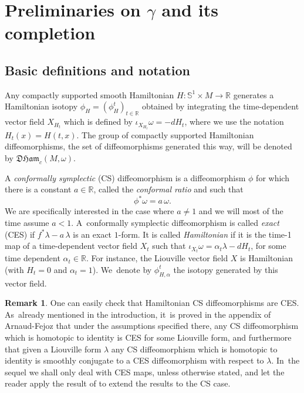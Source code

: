\documentclass[10pt]{amsart}
\theoremstyle{definition}
\newtheorem{rem}[thm]{Remark}
\newcommand{\R}{\mathbb{R}}
\newcommand{\DHam}{\mathfrak{DHam}}
\begin{document}
\section{Preliminaries on \texorpdfstring{$\gamma$}{gamma} and its completion}\label{sec:preliminaries}

\subsection{Basic definitions and notation}

Any compactly supported smooth Hamiltonian $H:\mathbb{S}^1\times M\to \R$ generates a Hamiltonian isotopy $\phi_H=(\phi_H^t)_{t\in\R}$ obtained by integrating the time-dependent vector field $X_{H_t}$ which is defined by $\iota_{X_{H_t}}\omega=-dH_t$, where we use the notation $H_t(x)=H(t,x)$. The group of compactly supported Hamiltonian diffeomorphisms, \ie the set of diffeomorphisms generated this way, will be denoted by $\DHam_c(M,\omega)$.

A \emph{conformally symplectic} (CS) diffeomorphism is a diffeomorphism $\phi$ for which there is a constant $a\in\R$, called the \emph{conformal ratio} and such that
\[
\phi^*\omega=a\,\omega.
\]
We are specifically interested in the case where $a\neq 1$ and we will most of the time assume $a<1$. A~conformally symplectic diffeomorphism is called \emph{exact} (CES) if $f^*\lambda-a\,\lambda$ is an exact $1$-form. It is called \emph{Hamiltonian} if it is the time-1 map of a time-dependent vector field $X_t$ such that $\iota_{X_t}\omega=\alpha_t\lambda-dH_t$, for some time dependent $\alpha_t\in\R$. For instance, the Liouville vector field $X$ is Hamiltonian (with $H_t=0$ and $\alpha_t=1$). We~denote by $\phi_{H, \alpha}^t$ the isotopy generated by this vector field.

\begin{rem}\label{rem:CSCES}
One can easily check that Hamiltonian CS diffeomorphisms are CES. As~already mentioned in the introduction, it~is proved in the appendix of Arnaud-Fejoz \cite{Arnaud-Fejoz} that under the assumptions specified there, any CS diffeomorphism which is homotopic to identity is CES for some Liouville form, and furthermore that given a Liouville form $\lambda$ any CS diffeomorphism which is homotopic to identity is smoothly conjugate to a CES diffeomorphism with respect to $\lambda$. In~the sequel we shall only deal with CES maps, unless otherwise stated, and let the reader apply the result of \cite{Arnaud-Fejoz} to extend the results to the CS case.
\end{rem}
\end{document}
